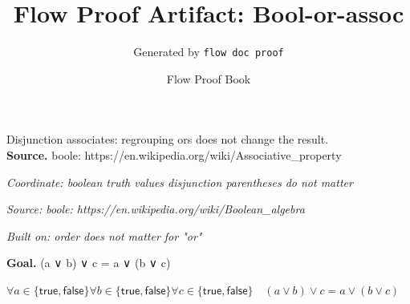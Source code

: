 \documentclass[11pt]{article}
\title{Flow Proof Artifact: Bool-or-assoc}
\author{Generated by \texttt{flow doc proof}}
\date{Flow Proof Book}
\theoremstyle{definition}
\begin{document}
\maketitle
Disjunction associates: regrouping ors does not change the result.\\[0.5em]
\textbf{Source.} boole: https://en.wikipedia.org/wiki/Associative\_property\\[0.5em]
\bigskip
{}\par
\smallskip\noindent\textit{Coordinate: boolean truth values \cdot disjunction \cdot parentheses do not matter}\par
\smallskip\noindent\textit{Source: boole: https://en.wikipedia.org/wiki/Boolean\_algebra}\par
\smallskip\noindent\textit{Built on: order does not matter for "or"}\par
\medskip
\noindent\textbf{Goal.} (a ∨ b) ∨ c = a ∨ (b ∨ c)\par
\noindent$\displaystyle \forall a \in \{\mathsf{true}, \mathsf{false}\} \forall b \in \{\mathsf{true}, \mathsf{false}\} \forall c \in \{\mathsf{true}, \mathsf{false}\}\quad (a \lor b) \lor c = a \lor (b \lor c)$\par
\medskip
\noindent
\end{document}
